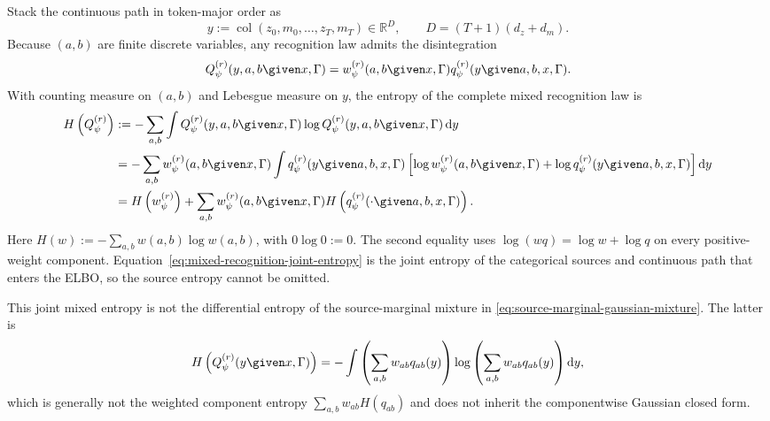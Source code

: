 Stack the continuous path in token-major order as
\begin{equation}
y:=\operatorname{col}(z_0,m_0,\ldots,z_T,m_T)
\in\mathbb R^D,
\qquad
D=(T+1)(d_z+d_m).
\label{eq:stacked-continuous-path}
\end{equation}
Because $(a,b)$ are finite discrete variables, any recognition law admits the disintegration
\begin{equation}
Q_\psi^{(r)}(y,a,b\given x,\Gamma)
=w_\psi^{(r)}(a,b\given x,\Gamma)
q_\psi^{(r)}(y\given a,b,x,\Gamma).
\label{eq:recognition-disintegration}
\end{equation}
With counting measure on $(a,b)$ and Lebesgue measure on $y$, the entropy of the complete mixed recognition law is
\begin{equation}
\begin{aligned}
H\left(Q_\psi^{(r)}\right)
&:=-\sum_{a,b}\int
Q_\psi^{(r)}(y,a,b\given x,\Gamma)
\log Q_\psi^{(r)}(y,a,b\given x,\Gamma)
\mathop{\mathrm dy}\\
&=-\sum_{a,b}w_\psi^{(r)}(a,b\given x,\Gamma)
\int q_\psi^{(r)}(y\given a,b,x,\Gamma)
\left[
\log w_\psi^{(r)}(a,b\given x,\Gamma)
+\log q_\psi^{(r)}(y\given a,b,x,\Gamma)
\right]
\mathop{\mathrm dy}\\
&=H\left(w_\psi^{(r)}\right)
+\sum_{a,b}w_\psi^{(r)}(a,b\given x,\Gamma)
H\left(q_\psi^{(r)}(\mathord{\cdot}\given a,b,x,\Gamma)\right).
\end{aligned}
\label{eq:mixed-recognition-joint-entropy}
\end{equation}
Here $H(w):=-\sum_{a,b}w(a,b)\log w(a,b)$, with $0\log0:=0$.  The second equality uses $\log(wq)=\log w+\log q$ on every positive-weight component.  Equation~\eqref{eq:mixed-recognition-joint-entropy} is the joint entropy of the categorical sources and continuous path that enters the ELBO, so the source entropy cannot be omitted.

This joint mixed entropy is not the differential entropy of the source-marginal mixture in \cref{eq:source-marginal-gaussian-mixture}.  The latter is
\begin{equation}
H\left(Q_\psi^{(r)}(y\given x,\Gamma)\right)
=-\int
\left(\sum_{a,b}w_{ab}q_{ab}(y)\right)
\log\left(\sum_{a,b}w_{ab}q_{ab}(y)\right)
\mathop{\mathrm dy},
\label{eq:source-marginal-mixture-entropy}
\end{equation}
which is generally not the weighted component entropy $\sum_{a,b}w_{ab}H(q_{ab})$ and does not inherit the componentwise Gaussian closed form.

